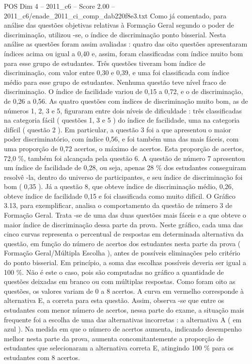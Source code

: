 \begin{textsample}{POS Dim 4 – 2011\_c6 – Score 2.00 – 2011\_c6/enade\_2011\_ci\_comp\_dab220f8e3.txt}
Como já comentado, para análise das questões objetivas relativas à Formação Geral segundo o poder de discriminação, utilizou -se, o índice de discriminação ponto bisserial.
Nesta análise as questões foram assim avaliadas : quatro das oito questões apresentaram índices acima ou igual a 0,40 e, assim, foram classificadas com índice muito bom para esse grupo de estudantes.
Três questões tiveram bom índice de discriminação, com valor entre 0,30 e 0,39, e uma foi classificada com índice médio para esse grupo de estudantes.
Nenhuma questão teve nível fraco de discriminação.
O índice de facilidade variou de 0,15 a 0,72, e o de discriminação, de 0,26 a 0,56.
As quatro questões com índices de discriminação muito bom, as de números 1, 2, 3 e 5, figuraram entre dois níveis de dificuldade : três classificadas na categoria fácil ( questões 1, 3 e 5 ) do índice de facilidade, uma na categoria difícil ( questão 2 ).
Em particular, a questão 3 foi a que apresentou o maior poder discriminatório, com índice 0,56, e foi também uma das mais fáceis, com uma proporção de 0,72 acertos, o máximo de acertos.
Esta proporção de acertos, 72,0 \%, também foi alcançada pela questão 6.
A questão de número 7 apresentou um índice de facilidade de 0,28, ou seja, apenas 28 \% dos estudantes conseguiram resolvê -la, dentro do universo de participantes, e seu índice de discriminação foi bom ( 0,35 ).
Já a questão 8, que obteve índice de discriminação médio, 0,26, obteve índice de facilidade 0,15 e foi classificada como muito difícil.
O Gráfico 3.13, para exemplificar, analisa o comportamento da questão de número 3 de Formação Geral.
Trata -se de uma das duas questões mais fáceis e a que obteve o maior índice de discriminação dessa parte da prova.
Neste gráfico, cada uma das cinco curvas representa o percentual de respostas em determinada alternativa da questão, em função do número de acertos dos estudantes nesta parte da prova ( Formação Geral/Múltipla Escolha ), antes de possíveis eliminações pelo critério do ponto bisserial.
Em princípio, a soma das escolhas possíveis deveria ser igual a 100 \%.
Não é este o caso, pois são computadas no gráfico a quantidade de questões deixadas em branco ou com múltiplas respostas.
Como foram oito as questões, os valores variam de 0 a 8 acertos.
A curva em vermelho corresponde à alternativa E, a correta para esta questão.
Assim, observa -se que entre os estudantes com menor número de acertos, nessa parte do exame, a situação mais frequente foi a escolha de uma das alternativas incorretas : a alternativa A ( em azul ).
Na medida em que o número de acertos aumenta, indicando desempenho melhor nesta parte da prova, aumenta concomitantemente a proporção de estudantes que selecionaram a alternativa correta E, atingindo 100 \% para os estudantes com 8 acertos.

\end{textsample}
